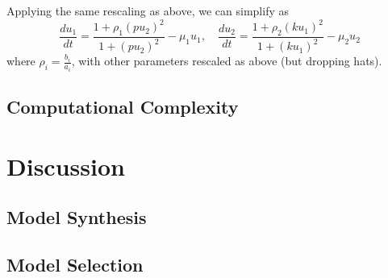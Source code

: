 Applying the same rescaling as above, we can simplify as
\begin{equation}
    \dfrac{du_1}{dt} = \dfrac{1 + \rho_1(p u_2)^2} { 1 + (p u_2)^2 } - \mu_1 u_1, \quad
    \dfrac{du_2}{dt} = \dfrac{1 + \rho_2(k u_1)^2} { 1 + (k u_1)^2 } - \mu_2 u_2
\end{equation}
where $\rho_i = \frac{b_i}{a_i}$, with other parameters rescaled as above (but dropping hats).

\subsection{Computational Complexity}

\section{Discussion}
\label{sec:discussion}

\subsection{Model Synthesis}


\subsection{Model Selection}

\appendix
\appendixpage
\addappheadtotoc







